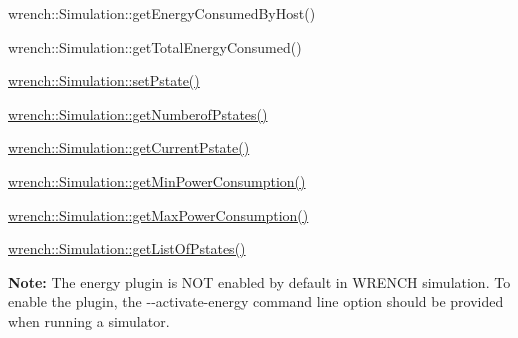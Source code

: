 \begin{DoxyItemize}
\item {\ttfamily wrench\+::\+Simulation\+::get\+Energy\+Consumed\+By\+Host()}
\item {\ttfamily wrench\+::\+Simulation\+::get\+Total\+Energy\+Consumed()}
\item {\ttfamily \hyperlink{classwrench_1_1_simulation_adf4675a8c9c62c93bfbd3dc4a4e46556}{wrench\+::\+Simulation\+::set\+Pstate()}}
\item {\ttfamily \hyperlink{classwrench_1_1_simulation_a5e8d5b963d2278c79b49a0ed7db2b933}{wrench\+::\+Simulation\+::get\+Numberof\+Pstates()}}
\item {\ttfamily \hyperlink{classwrench_1_1_simulation_a3d204b229feec1eee4f1e82d92490d81}{wrench\+::\+Simulation\+::get\+Current\+Pstate()}}
\item {\ttfamily \hyperlink{classwrench_1_1_simulation_afdf2ae84f6b3c8b51c5189199bebb52e}{wrench\+::\+Simulation\+::get\+Min\+Power\+Consumption()}}
\item {\ttfamily \hyperlink{classwrench_1_1_simulation_ae76b92ce868c6e6c1683377d869a5b34}{wrench\+::\+Simulation\+::get\+Max\+Power\+Consumption()}}
\item {\ttfamily \hyperlink{classwrench_1_1_simulation_abb75fd040236995186d9ad45434fe069}{wrench\+::\+Simulation\+::get\+List\+Of\+Pstates()}}
\end{DoxyItemize}

{\bfseries Note\+:} The energy plugin is N\+OT enabled by default in W\+R\+E\+N\+CH simulation. To enable the plugin, the {\ttfamily -\/-\/activate-\/energy} command line option should be provided when running a simulator. 